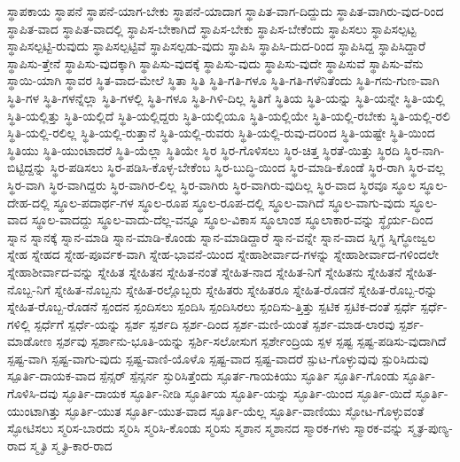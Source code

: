 {ಸ್ಥಾಪಕಾಯ
ಸ್ಥಾಪನೆ
ಸ್ಥಾಪನೆ-ಯಾಗ-ಬೇಕು
ಸ್ಥಾಪನೆ-ಯಾದಾಗ
ಸ್ಥಾಪಿತ-ವಾಗ-ದಿದ್ದುದು
ಸ್ಥಾಪಿತ-ವಾಗಿರು-ವುದ-ರಿಂದ
ಸ್ಥಾಪಿತ-ವಾದ
ಸ್ಥಾಪಿತ-ವಾದಲ್ಲಿ
ಸ್ಥಾಪಿಸ-ಬೇಕಾಗಿದೆ
ಸ್ಥಾಪಿಸ-ಬೇಕು
ಸ್ಥಾಪಿಸ-ಬೇಕೆಂದು
ಸ್ಥಾಪಿಸಲು
ಸ್ಥಾಪಿಸಲ್ಪಟ್ಟ
ಸ್ಥಾಪಿಸಲ್ಪಟ್ಟಿ-ರುವುದು
ಸ್ಥಾಪಿಸಲ್ಪಟ್ಟಿವೆ
ಸ್ಥಾಪಿಸಲ್ಪಡು-ವುದು
ಸ್ಥಾಪಿಸಿ
ಸ್ಥಾಪಿಸಿ-ದುದ-ರಿಂದ
ಸ್ಥಾಪಿಸಿದ್ದ
ಸ್ಥಾಪಿಸಿದ್ದಾರೆ
ಸ್ಥಾಪಿಸು-ತ್ತೇನೆ
ಸ್ಥಾಪಿಸು-ವುದಕ್ಕಾಗಿ
ಸ್ಥಾಪಿಸು-ವುದಕ್ಕೆ
ಸ್ಥಾಪಿಸು-ವುದು
ಸ್ಥಾಪಿಸು-ವುದೇ
ಸ್ಥಾಪಿಸುವೆ
ಸ್ಥಾಪಿಸು-ವೆನು
ಸ್ಥಾಯಿ-ಯಾಗಿ
ಸ್ಥಾವರ
ಸ್ಥಿತ-ವಾದ-ಮೇಲೆ
ಸ್ಥಿತಾ
ಸ್ಥಿತಿ
ಸ್ಥಿತಿ-ಗತಿ-ಗಳೂ
ಸ್ಥಿತಿ-ಗತಿ-ಗಳೆನಿತೆಂದು
ಸ್ಥಿತಿ-ಗನು-ಗುಣ-ವಾಗಿ
ಸ್ಥಿತಿ-ಗಳ
ಸ್ಥಿತಿ-ಗಳನ್ನೆಲ್ಲಾ
ಸ್ಥಿತಿ-ಗಳಲ್ಲಿ
ಸ್ಥಿತಿ-ಗಳೂ
ಸ್ಥಿತಿ-ಗಿಳಿ-ದಿಲ್ಲ
ಸ್ಥಿತಿಗೆ
ಸ್ಥಿತಿಯ
ಸ್ಥಿತಿ-ಯನ್ನು
ಸ್ಥಿತಿ-ಯನ್ನೇ
ಸ್ಥಿತಿ-ಯಲ್ಲಿ
ಸ್ಥಿತಿ-ಯಲ್ಲಿತ್ತು
ಸ್ಥಿತಿ-ಯಲ್ಲಿದೆ
ಸ್ಥಿತಿ-ಯಲ್ಲಿದ್ದರು
ಸ್ಥಿತಿ-ಯಲ್ಲಿಯೂ
ಸ್ಥಿತಿ-ಯಲ್ಲಿಯೇ
ಸ್ಥಿತಿ-ಯಲ್ಲಿ-ರಬೇಕು
ಸ್ಥಿತಿ-ಯಲ್ಲಿ-ರಲಿ
ಸ್ಥಿತಿ-ಯಲ್ಲಿ-ರಲಿಲ್ಲ
ಸ್ಥಿತಿ-ಯಲ್ಲಿ-ರುತ್ತಾನೆ
ಸ್ಥಿತಿ-ಯಲ್ಲಿ-ರುವರು
ಸ್ಥಿತಿ-ಯಲ್ಲಿ-ರುವು-ದರಿಂದ
ಸ್ಥಿತಿ-ಯಷ್ಟೇ
ಸ್ಥಿತಿ-ಯಿಂದ
ಸ್ಥಿತಿಯು
ಸ್ಥಿತಿ-ಯುಂಟಾದರೆ
ಸ್ಥಿತಿ-ಯೆಲ್ಲಾ
ಸ್ಥಿತಿಯೇ
ಸ್ಥಿರ
ಸ್ಥಿರ-ಗೊಳಿಸಲು
ಸ್ಥಿರ-ಚಿತ್ತ
ಸ್ಥಿರತೆ-ಯಿತ್ತು
ಸ್ಥಿರದಿ
ಸ್ಥಿರ-ನಾಗಿ-ಬಿಟ್ಟಿದ್ದನ್ನು
ಸ್ಥಿರ-ಪಡಿಸಲು
ಸ್ಥಿರ-ಪಡಿಸಿ-ಕೊಳ್ಳ-ಬೇಕೆಂಬ
ಸ್ಥಿರ-ಬುದ್ಧಿ-ಯಿಂದ
ಸ್ಥಿರ-ಮಾಡಿ-ಕೊಂಡೆ
ಸ್ಥಿರ-ರಾಗಿ
ಸ್ಥಿರ-ವಲ್ಲ
ಸ್ಥಿರ-ವಾಗಿ
ಸ್ಥಿರ-ವಾಗಿದ್ದರು
ಸ್ಥಿರ-ವಾಗಿರ-ಲಿಲ್ಲ
ಸ್ಥಿರ-ವಾಗಿರು
ಸ್ಥಿರ-ವಾಗಿರು-ವುದಿಲ್ಲ
ಸ್ಥಿರ-ವಾದ
ಸ್ಥಿರವೂ
ಸ್ಥೂಲ
ಸ್ಥೂಲ-ದೇಹ-ದಲ್ಲಿ
ಸ್ಥೂಲ-ಪದಾರ್ಥ-ಗಳ
ಸ್ಥೂಲ-ರೂಪ
ಸ್ಥೂಲ-ರೂಪ-ದಲ್ಲಿ
ಸ್ಥೂಲ-ವಾಗಿದೆ
ಸ್ಥೂಲ-ವಾಗು-ವುದು
ಸ್ಥೂಲ-ವಾದ
ಸ್ಥೂಲ-ವಾದದ್ದು
ಸ್ಥೂಲ-ವಾದು-ದೆಲ್ಲ-ವನ್ನೂ
ಸ್ಥೂಲ-ವಿಕಾಸ
ಸ್ಥೂಲಾಂಶ
ಸ್ಥೂಲಾಕಾರ-ವನ್ನು
ಸ್ಥೈರ್ಯ-ದಿಂದ
ಸ್ನಾನ
ಸ್ನಾನಕ್ಕೆ
ಸ್ನಾನ-ಮಾಡಿ
ಸ್ನಾನ-ಮಾಡಿ-ಕೊಂಡು
ಸ್ನಾನ-ಮಾಡಿದ್ದಾರೆ
ಸ್ನಾನ-ವನ್ನೇ
ಸ್ನಾನ-ವಾದ
ಸ್ನಿಗ್ಧ
ಸ್ನಿಗ್ಧೋಜ್ವಲ
ಸ್ನೇಹ
ಸ್ನೇಹದ
ಸ್ನೇಹ-ಪೂರ್ವಕ-ವಾಗಿ
ಸ್ನೇಹ-ಭಾವನೆ-ಯಿಂದ
ಸ್ನೇಹಾಶೀರ್ವಾದ-ಗಳನ್ನು
ಸ್ನೇಹಾಶೀರ್ವಾದ-ಗಳಿಂದಲೇ
ಸ್ನೇಹಾಶೀರ್ವಾದ-ವನ್ನು
ಸ್ನೇಹಿತ
ಸ್ನೇಹಿತನ
ಸ್ನೇಹಿತ-ನಂತೆ
ಸ್ನೇಹಿತ-ನಾದ
ಸ್ನೇಹಿತ-ನಿಗೆ
ಸ್ನೇಹಿತನು
ಸ್ನೇಹಿತನೆ
ಸ್ನೇಹಿತ-ನೊಬ್ಬ-ನಿಗೆ
ಸ್ನೇಹಿತ-ನೊಬ್ಬನು
ಸ್ನೇಹಿತ-ರಲ್ಲೊಬ್ಬರು
ಸ್ನೇಹಿತರು
ಸ್ನೇಹಿತರೂ
ಸ್ನೇಹಿತ-ರೊಡನೆ
ಸ್ನೇಹಿತ-ರೊಬ್ಬ-ರನ್ನು
ಸ್ನೇಹಿತ-ರೊಬ್ಬ-ರೊಡನೆ
ಸ್ಪಂದನ
ಸ್ಪಂದಿಸಲು
ಸ್ಪಂದಿಸಿ
ಸ್ಪಂದಿಸಿರಲು
ಸ್ಪಂದಿಸು-ತ್ತಿತ್ತು
ಸ್ಪಟಿಕ
ಸ್ಪಟಿಕ-ದಂತೆ
ಸ್ಪರ್ಧೆ
ಸ್ಪರ್ಧೆ-ಗಳಿಲ್ಲಿ
ಸ್ಪರ್ಧೆಗೆ
ಸ್ಪರ್ಧೆ-ಯನ್ನು
ಸ್ಪರ್ಶ
ಸ್ಪರ್ಶದಿ
ಸ್ಪರ್ಶ-ದಿಂದ
ಸ್ಪರ್ಶ-ಮಣಿ-ಯಂತೆ
ಸ್ಪರ್ಶ-ಮಾಡ-ಲಾರವು
ಸ್ಪರ್ಶ-ಮಾಡೋಣ
ಸ್ಪರ್ಶವು
ಸ್ಪರ್ಶಾನು-ಭೂತಿ-ಯನ್ನು
ಸ್ಪರ್ಶಿ-ಸಲೋಸುಗ
ಸ್ಪರ್ಶೇಂದ್ರಿಯ
ಸ್ಪಳ
ಸ್ಪಷ್ಟ
ಸ್ಪಷ್ಟ-ಪಡಿಸು-ವುದಾಗಿದೆ
ಸ್ಪಷ್ಟ-ವಾಗಿ
ಸ್ಪಷ್ಟ-ವಾಗು-ವುದು
ಸ್ಪಷ್ಟ-ವಾಣಿ-ಯೊಳೊ
ಸ್ಪಷ್ಟ-ವಾದ
ಸ್ಪಷ್ಟ-ವಾದರೆ
ಸ್ಪುಟ-ಗೊಳ್ಳುವುವು
ಸ್ಪುರಿಸಿದುವು
ಸ್ಪೂರ್ತಿ-ದಾಯಕ-ವಾದ
ಸ್ಪೆನ್ಸರ್
ಸ್ಪೆನ್ಸರ್ನ
ಸ್ಫುರಿಸಿತ್ತೆಂದು
ಸ್ಫೂರ್ತ-ಗಾಯಕಿಯು
ಸ್ಫೂರ್ತಿ
ಸ್ಫೂರ್ತಿ-ಗೊಂಡು
ಸ್ಫೂರ್ತಿ-ಗೊಳಿಸಿ-ದವು
ಸ್ಫೂರ್ತಿ-ದಾಯಕ
ಸ್ಫೂರ್ತಿ-ನೀಡಿ
ಸ್ಫೂರ್ತಿಯ
ಸ್ಫೂರ್ತಿ-ಯನ್ನು
ಸ್ಫೂರ್ತಿ-ಯಿಂದ
ಸ್ಫೂರ್ತಿ-ಯಿದೆ
ಸ್ಫೂರ್ತಿ-ಯುಂಟಾಗಿತ್ತು
ಸ್ಫೂರ್ತಿ-ಯುತ
ಸ್ಫೂರ್ತಿ-ಯುತ-ವಾದ
ಸ್ಫೂರ್ತಿ-ಯೆಲ್ಲ
ಸ್ಫೂರ್ತಿ-ವಾಣಿಯು
ಸ್ಫೋಟ-ಗೊಳ್ಳುವಂತೆ
ಸ್ಫೋಟಿಸಲು
ಸ್ಮರಿಸ-ಬಾರದು
ಸ್ಮರಿಸಿ
ಸ್ಮರಿಸಿ-ಕೊಂಡು
ಸ್ಮರಿಸು
ಸ್ಮಶಾನ
ಸ್ಮಶಾನದ
ಸ್ಮಾರಕ-ಗಳು
ಸ್ಮಾರಕ-ವನ್ನು
ಸ್ಮೃತ-ಪುಣ್ಯ-ರಾದ
ಸ್ಮೃತಿ
ಸ್ಮೃತಿ-ಕಾರ-ರಾದ
}
